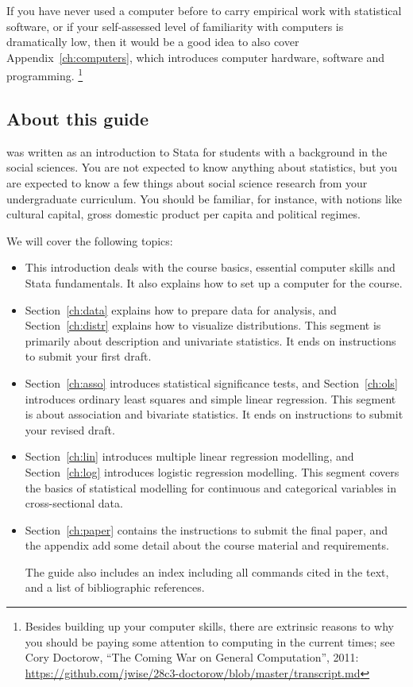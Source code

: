   If you have never used a computer before to carry empirical work with statistical software, or if your self-assessed level of familiarity with computers is dramatically low, then it would be a good idea to also cover Appendix~\ref{ch:computers}, which introduces computer hardware, software and programming.%
  \footnote{Besides building up your computer skills, there are extrinsic reasons to why you should be paying some attention to computing in the current times; see Cory Doctorow, ``The Coming War on General Computation'', 2011: \url{https://github.com/jwise/28c3-doctorow/blob/master/transcript.md}}%

%
\subsection{About this guide}%
	 was written as an introduction to Stata for students with a background in the social sciences. You are not expected to know anything about statistics, but you are expected to know a few things about social science research from your undergraduate curriculum. You should be familiar, for instance, with notions like cultural capital, gross domestic product per capita and political regimes.%

	We will cover the following topics:%

	\begin{itemize}
		\item This introduction deals with the course basics, essential computer skills and Stata fundamentals. It also explains how to set up a computer for the course.%
	
		\item %
		Section~\ref{ch:data} explains how to prepare data for analysis, and %
		Section~\ref{ch:distr} explains how to visualize distributions. This segment is primarily about description and univariate statistics. %
    It ends on instructions to submit your first draft.
	
		\item %
		Section~\ref{ch:asso} introduces statistical significance tests, and %
		Section~\ref{ch:ols} introduces ordinary least squares and simple linear regression. This segment is about association and bivariate statistics. %
    It ends on instructions to submit your revised draft.

		\item %
		Section~\ref{ch:lin} introduces multiple linear regression modelling, and %
		Section~\ref{ch:log} introduces logistic regression modelling. This segment covers the basics of statistical modelling for continuous and categorical variables in cross-sectional data. %

		\item %
		Section~\ref{ch:paper} contains the instructions to submit the final paper, and the appendix add some detail about the course material and requirements.%
    
    The guide also includes an index including all commands cited in the text, and a list of bibliographic references.%
	\end{itemize}

